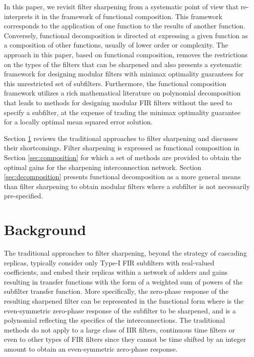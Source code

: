 \documentclass[journal] {IEEEtran}
\begin{document}
In this paper, we revisit filter sharpening from a systematic point of view that re-interprets it in the framework of functional composition. This framework corresponds to the application of one function to the results of another function. Conversely, functional decomposition is directed at expressing a given function as a composition of other functions, usually of lower order or complexity. The approach in this paper, based on functional composition, removes the restrictions on the types of the filters that can be sharpened and also presents a systematic framework for designing modular filters with minimax optimality guarantees for this unrestricted set of subfilters. Furthermore, the functional composition framework utilizes a rich mathematical literature on polynomial decomposition that leads to methods for designing modular FIR filters without the need to specify a subfilter, at the expense of trading the minimax optimality guarantee for a locally optimal mean squared error solution.

Section \ref{sec:sharpening} reviews the traditional approaches to filter sharpening and discusses their shortcomings. Filter sharpening is expressed as functional composition in Section \ref{sec:composition} for which a set of methods are provided to obtain the optimal gains for the sharpening interconnection network. Section \ref{sec:decomposition} presents functional decomposition as a more general means than filter sharpening to obtain modular filters where a subfilter is not necessarily pre-specified. 

\section{Background}\label{sec:sharpening}
The traditional approaches to filter sharpening, beyond the strategy of cascading replicas, typically consider only Type-I FIR subfilters with real-valued coefficients, and embed their replicas within a network of adders and gains resulting in transfer functions with the form of a weighted sum of powers of the subfilter transfer function. More specifically, the zero-phase response of the resulting sharpened filter can be represented in the functional form  where  is the even-symmetric zero-phase response of the subfilter to be sharpened, and  is a polynomial reflecting the specifics of the interconnections. The traditional methods do not apply to a large class of IIR filters, continuous time filters or even to other types of FIR filters since they cannot be time shifted by an integer amount to obtain an even-symmetric zero-phase response.
\end{document}
